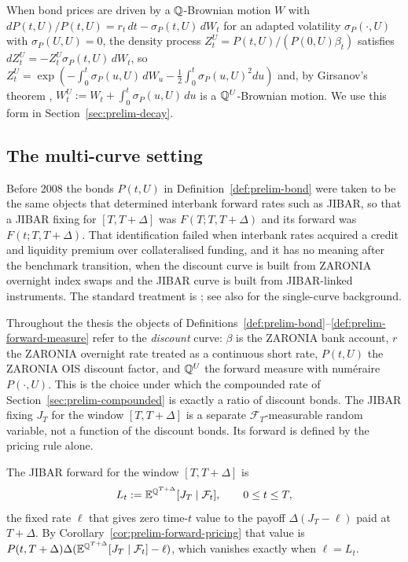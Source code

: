 \documentclass[../../../main.tex]{subfiles}
\begin{document}
\begin{remark}\label{rem:prelim-girsanov}
When bond prices are driven by a $\mathbb{Q}$-Brownian motion $W$ with $dP(t,U)/P(t,U)=r_t\,dt-\sigma_P(t,U)\,dW_t$ for an adapted volatility $\sigma_P(\cdot,U)$ with $\sigma_P(U,U)=0$, the density process $Z^{U}_t=P(t,U)/(P(0,U)\beta_t)$ satisfies $dZ^{U}_t=-Z^{U}_t\sigma_P(t,U)\,dW_t$, so $Z^{U}_t=\exp(-\int_0^t\sigma_P(u,U)\,dW_u-\tfrac12\int_0^t\sigma_P(u,U)^2du)$ and, by Girsanov's theorem \cite[Thm.~3.5.1]{karatzas1991}, $W^{U}_t:=W_t+\int_0^t\sigma_P(u,U)\,du$ is a $\mathbb{Q}^{U}$-Brownian motion. We use this form in Section~\ref{sec:prelim-decay}.
\end{remark}

\subsection{The multi-curve setting}\label{subsec:prelim-multicurve}

Before 2008 the bonds $P(t,U)$ in Definition~\ref{def:prelim-bond} were taken to be the same objects that determined interbank forward rates such as JIBAR, so that a JIBAR fixing for $[T,T+\Delta]$ was $F(T;T,T+\Delta)$ and its forward was $F(t;T,T+\Delta)$. That identification failed when interbank rates acquired a credit and liquidity premium over collateralised funding, and it has no meaning after the benchmark transition, when the discount curve is built from ZARONIA overnight index swaps and the JIBAR curve is built from JIBAR-linked instruments. The standard treatment is \cite{henrard2014}; see also \cite{brigo2006} for the single-curve background.

Throughout the thesis the objects of Definitions~\ref{def:prelim-bond}--\ref{def:prelim-forward-measure} refer to the \emph{discount} curve: $\beta$ is the ZARONIA bank account, $r$ the ZARONIA overnight rate treated as a continuous short rate, $P(t,U)$ the ZARONIA OIS discount factor, and $\mathbb{Q}^{U}$ the forward measure with num\'eraire $P(\cdot,U)$. This is the choice under which the compounded rate of Section~\ref{sec:prelim-compounded} is exactly a ratio of discount bonds. The JIBAR fixing $J_T$ for the window $[T,T+\Delta]$ is a separate $\mathcal F_T$-measurable random variable, not a function of the discount bonds. Its forward is defined by the pricing rule alone.

\begin{definition}\label{def:prelim-jibar-forward}
The JIBAR forward for the window $[T,T+\Delta]$ is
\[
L_t:=\mathbb{E}^{\mathbb{Q}^{T+\Delta}}[J_T\mid\mathcal F_t],\qquad 0\le t\le T,
\]
the fixed rate $\ell$ that gives zero time-$t$ value to the payoff $\Delta(J_T-\ell)$ paid at $T+\Delta$. By Corollary~\ref{cor:prelim-forward-pricing} that value is $P(t,T+\Delta)\Delta(\mathbb{E}^{\mathbb{Q}^{T+\Delta}}[J_T\mid\mathcal F_t]-\ell)$, which vanishes exactly when $\ell=L_t$.
\end{definition}
\end{document}
